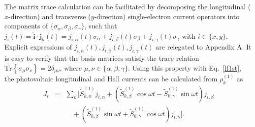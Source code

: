 \documentclass[reprint,amsmath,amssymb,aps,prb]{revtex4-1}
\begin{document}
The matrix trace calculation can be facilitated by decomposing the  longitudinal ($x$-direction) and transverse ($y$-direction) single-electron current operators into components of $\{\sigma_\alpha, \sigma_\beta, \sigma_\gamma\}$, such that $j_{i}(t)=\hat{\bm{i}}\cdot\bm{j}_k(t)=j_{i,\alpha}(t)\sigma_\alpha+j_{i,\beta}(t)\sigma_\beta+j_{i,\gamma}(t)\sigma_\gamma$ with  $i \in \{x,y\}$. Explicit expressions of $j_{i,\alpha}(t), j_{i,\beta}(t), j_{i,\gamma}(t)$ are relegated to Appendix A. It is easy to verify that the basis matrices satisfy the trace relation $\text{Tr}\left\{\sigma_{\mu}\sigma_{\nu}\right\}=2\delta_{\mu\nu}$, where $\mu,\nu \in \{\alpha,\beta,\gamma\}$. Using this property with Eq.~\eqref{lf1st}, the photovoltaic longitudinal and Hall currents can be calculated from $\rho_k^{(1)}$ as 
%
\begin{eqnarray}
J_{i} &=&\sum_k \bigg[\tilde{S}_{k,\alpha}^{(1)}j_{i,\alpha}+ \left(\tilde{S}_{k,\beta}^{(1)}\cos\omega t  -\tilde{S}_{k,\gamma}^{(1)}\sin\omega t\right )j_{i,\beta} \nonumber \\
&&\quad+\left(\tilde{S}_{k,\beta}^{(1)}\sin\omega t  +\tilde{S}_{k,\gamma}^{(1)} \cos\omega t\right)j_{i,\gamma}\bigg].  \label{Jitau}  
\end{eqnarray}
\end{document}
